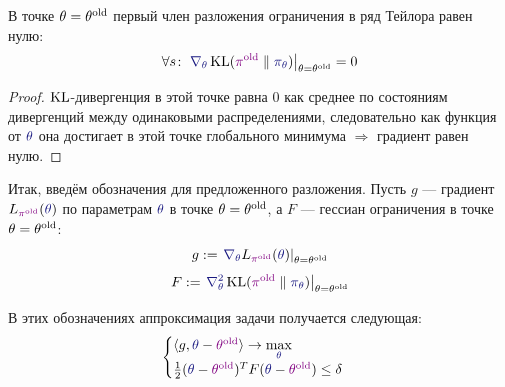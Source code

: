 \begin{proposition}
В точке $\theta = \theta^{\mathrm{old}}$ первый член разложения ограничения в ряд Тейлора равен нулю:
\begin{equation*}
\forall s \colon \left. \textcolor{ChadBlue}{\nabla_\theta} \KL(\textcolor{ChadPurple}{\pi^{\old}} \parallel \textcolor{ChadBlue}{\pi_\theta}) \right|_{\theta = \theta^{\old}} = 0
\end{equation*}
\begin{proof}
$\operatorname{KL}$-дивергенция в этой точке равна 0 как среднее по состояниям дивергенций между одинаковыми распределениями, следовательно как функция от $\textcolor{ChadBlue}{\theta}$ она достигает в этой точке глобального минимума $\Rightarrow$ градиент равен нулю.
\end{proof}
\end{proposition}

Итак, введём обозначения для предложенного разложения. Пусть $g$ --- градиент $L_{\textcolor{ChadPurple}{\pi^{\old}}}(\textcolor{ChadBlue}{\theta})$ по параметрам $\textcolor{ChadBlue}{\theta}$ в точке $\theta = \theta^{\mathrm{old}}$, а $F$ --- гессиан ограничения в точке $\theta = \theta^{\mathrm{old}}$:
\begin{equation}\label{trpo_gradient}
    g := \left. \textcolor{ChadBlue}{\nabla_\theta} L_{\textcolor{ChadPurple}{\pi^{\old}}}(\textcolor{ChadBlue}{\theta}) \right|_{\theta = \theta^{\old}}
\end{equation}
\begin{equation}\label{trpo_hessian}
    F := \left. \textcolor{ChadBlue}{\nabla^2_\theta} \KL(\textcolor{ChadPurple}{\pi^{\old}} \parallel \textcolor{ChadBlue}{\pi_\theta}) \right|_{\theta = \theta^{\old}}
\end{equation}

В этих обозначениях аппроксимация задачи получается следующая:
\begin{equation}\label{approximatetrustregion}
\begin{cases}
\langle g , \textcolor{ChadBlue}{\theta} - \textcolor{ChadPurple}{\theta^{\old}} \rangle \to \max\limits_{\textcolor{ChadBlue}{\theta}} \\
\frac{1}{2} (\textcolor{ChadBlue}{\theta} - \textcolor{ChadPurple}{\theta^{\old}})^T F (\textcolor{ChadBlue}{\theta} - \textcolor{ChadPurple}{\theta^{\old}}) \le \delta
\end{cases}
\end{equation}

